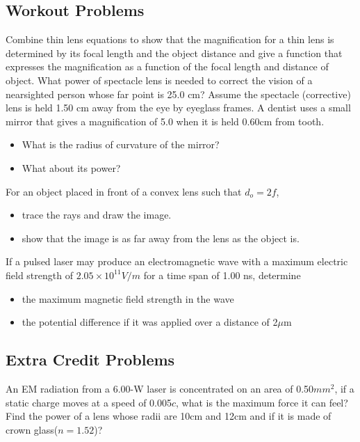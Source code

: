\documentclass[12pt,addpoints]{exam}
\begin{document}
{{{\begin{questions}
		    		\subsection*{Workout Problems}
					\question Combine thin lens equations to show that the magnification for a thin lens is determined by its focal length and the object distance and give a function that expresses the magnification as a function of the focal 	length and distance of object.\vspace{1.5in}
					\question What power of spectacle lens is needed to correct the vision of a nearsighted person whose far point is 25.0 cm? Assume the spectacle (corrective) lens is held 1.50 cm away from the eye by eyeglass frames.\vspace{1.5in}
					\question A dentist uses a small mirror that gives a magnification of 5.0 when it is held 0.60cm from tooth. 
					\begin{itemize}
						\item What is the radius of curvature of the mirror?\vspace{1.5in} 
						\item What about its power?\vspace{1in}
					\end{itemize}
					\question For an object placed in front of a convex lens such that $d_o=2f$,
					\begin{itemize}
						\item trace the rays and draw the image.\vspace{1in}
						\item show that the image is as far away from the lens as the object is. \vspace{1.5in}
					\end{itemize} 
					\question If a pulsed laser may produce an electromagnetic wave with a maximum electric field strength of  $2.05\times10^{11}V/m$ for a time span of 1.00 ns, determine
					\begin{itemize}
						\item the maximum magnetic field strength in the wave\vspace{1.5in}
						\item the potential difference if it was applied over a distance of 2$\mu$m\vspace{1.5in}
					\end{itemize}
					\subsection*{Extra Credit Problems}
					\question An EM radiation from a 6.00-W laser is concentrated on an area of 0.50$mm^2$, if a static charge moves at a speed of 0.005$c$, what is the maximum force it can feel?\vspace{1in}
					\question Find the power of a lens whose radii are 10cm and 12cm and if it is made of crown glass($n=1.52$)?\vspace{1.5in}
				\end{questions}
				\begin{center}

\end{center}}}}
\end{document}
